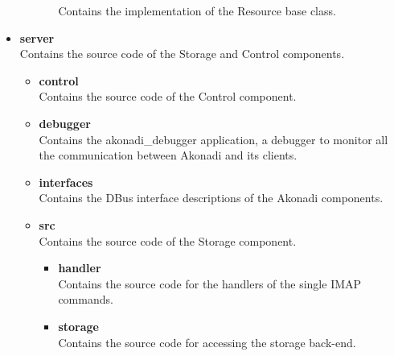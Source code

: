\documentclass[]{report}
\begin{document}
\begin{itemize}
\begin{itemize}
\begin{itemize}
        Contains the implementation of the Resource base class.
    \end{itemize}
  \end{itemize}
  \item \textbf{server}\\
    Contains the source code of the Storage and Control components.
  \begin{itemize}
    \item \textbf{control}\\
      Contains the source code of the Control component.
    \item \textbf{debugger}\\
      Contains the akonadi\_debugger application, a debugger to monitor all the communication
      between Akonadi and its clients.
    \item \textbf{interfaces}\\
      Contains the DBus interface descriptions of the Akonadi components.
    \item \textbf{src}\\
      Contains the source code of the Storage component.
    \begin{itemize}
      \item \textbf{handler}\\
        Contains the source code for the handlers of the single IMAP commands.
      \item \textbf{storage}\\
        Contains the source code for accessing the storage back-end.
    \end{itemize}
  \end{itemize}
\end{itemize}
\end{document}
